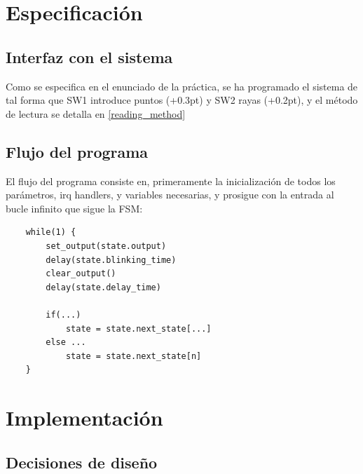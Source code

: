 \documentclass[a4paper,openright,12pt]{article}
\newcommand{\punto}{\kern+0.3pt\raisebox{0.35ex}{\huge\textbf.}}
\newcommand{\raya}{\kern+0.2pt\raisebox{-0.35ex}{\huge\textbf-}}
\begin{document}
\clearpage
\section{Especificación}
\subsection{Interfaz con el sistema}\label{design_button_translation}
Como se especifica en el enunciado de la práctica, se ha programado el sistema de tal forma que SW1 introduce puntos (\punto) y SW2 rayas (\raya), y el método de lectura se detalla en \ref{reading_method}

\subsection{Flujo del programa}
El flujo del programa consiste en, primeramente la inicialización de todos los parámetros, irq handlers, y variables necesarias, y prosigue con la entrada al bucle infinito que sigue la FSM:
\begin{samepage}    
\begin{verbatim}
    while(1) {
        set_output(state.output)
        delay(state.blinking_time)
        clear_output()
        delay(state.delay_time)
        
        if(...)
            state = state.next_state[...]
        else ...
            state = state.next_state[n]
    }
\end{verbatim}
\end{samepage}


\clearpage
\section{Implementación}
\subsection{Decisiones de diseño}
\end{document}
